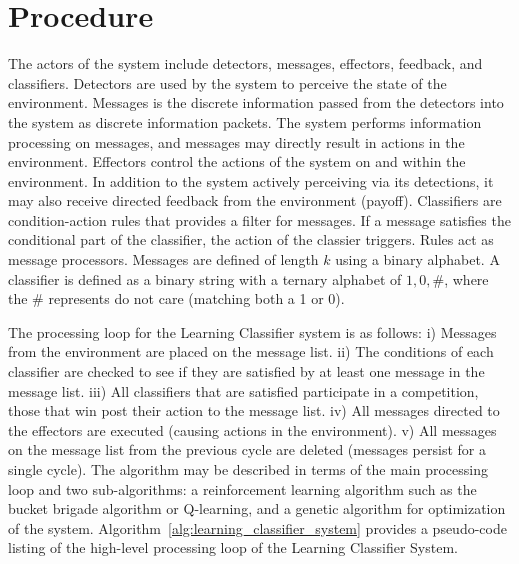 \documentclass[a4paper, 11pt]{article}
\begin{document}
\section{Procedure}
\label{sec:procedure}
The actors of the system include detectors, messages, effectors, feedback, and classifiers. Detectors are used by the system to perceive the state of the environment. Messages is the discrete information passed from the detectors into the system as discrete information packets. The system performs information processing on messages, and messages may directly result in actions in the environment. Effectors control the actions of the system on and within the environment. In addition to the system actively perceiving via its detections, it may also receive directed feedback from the environment (payoff). Classifiers are condition-action rules that provides a filter for messages. If a message satisfies the conditional part of the classifier, the action of the classier triggers. Rules act as message processors.
Messages are defined of length $k$ using a binary alphabet. A classifier is defined as a binary string with a ternary alphabet of ${1, 0, \#}$, where the $\#$ represents do not care (matching both a 1 or 0). 

The processing loop for the Learning Classifier system is as follows: i) Messages from the environment are placed on the message list. ii) The conditions of each classifier are checked to see if they are satisfied by at least one message in the message list. iii) All classifiers that are satisfied participate in a competition, those that win post their action to the message list. iv) All messages directed to the effectors are executed (causing actions in the environment). v) All messages on the message list from the previous cycle are deleted (messages persist for a single cycle).
The algorithm may be described in terms of the main processing loop and two sub-algorithms: a reinforcement learning algorithm such as the bucket brigade algorithm or Q-learning, and a genetic algorithm for optimization of the system.
Algorithm~\ref{alg:learning_classifier_system} provides a pseudo-code listing of the high-level processing loop of the Learning Classifier System. 
\end{document}
